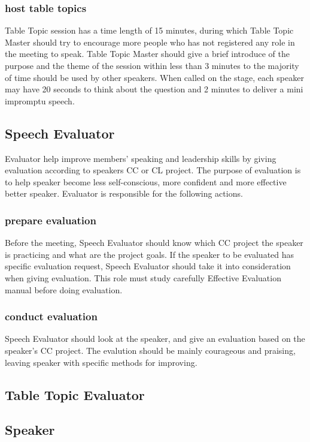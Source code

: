 \subsubsection{host table topics}
Table Topic session has a time length of 15 minutes, during which Table Topic Master 
should try to encourage more people who has not registered any role in the meeting to
speak. Table Topic Master should give a brief introduce of the purpose and the theme 
of the session within less than 3 minutes to the majority of time should be used by 
other speakers. When called on the stage, each speaker may have 20 seconds to think 
about the question and 2 minutes to deliver a mini impromptu speech. 

\subsection{Speech Evaluator}
Evaluator help improve members' speaking and leadership skills by giving evaluation 
according to speakers CC or CL project. The purpose of evaluation is to help speaker
become less self-conscious, more confident and more effective better speaker. 
Evaluator is responsible for the following actions.

\subsubsection{prepare evaluation}
Before the meeting, Speech Evaluator should know which CC project the speaker is 
practicing and what are the project goals. If the speaker to be evaluated has specific
evaluation request, Speech Evaluator should take it into consideration when giving
evaluation. This role must study carefully Effective Evaluation manual before doing 
evaluation.

\subsubsection{conduct evaluation}
Speech Evaluator should look at the speaker, and give an evaluation based on the 
speaker's CC project. The evalution should be mainly courageous and praising, leaving
speaker with specific methods for improving. 

\subsection{Table Topic Evaluator}
\subsection{Speaker}
